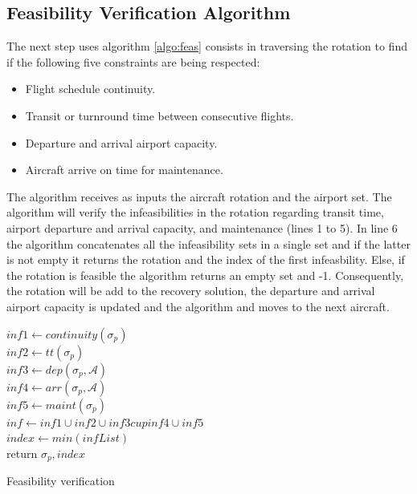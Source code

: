 \subsection{Feasibility Verification Algorithm} \label{sec:feasVer}
The next step uses algorithm \ref{algo:feas} consists in traversing the rotation to find  if the following five constraints are being respected:\\

\begin{itemize}
	\item Flight schedule continuity.\\
	\item Transit or turnround time between consecutive flights.\\
	\item Departure and arrival airport capacity.\\
	\item Aircraft arrive on time for maintenance.\\
\end{itemize}

The algorithm receives as inputs the aircraft rotation and the airport set.   The algorithm will  verify the infeasibilities in the rotation regarding transit time, airport departure and arrival capacity, and maintenance (lines 1 to 5). In line 6 the algorithm concatenates all the infeasibility sets in a single set and if the latter is not empty it returns the rotation and the index of the first infeasbility. Else, if the rotation is feasible the algorithm returns an empty set and -1. Consequently, the rotation will be add to the recovery solution, the departure and arrival airport capacity is updated and the algorithm and moves to the next aircraft.



	\begin{algorithm}[H]
		\DontPrintSemicolon
		$inf1 \gets continuity(\sigma_p)$\\		%
		$inf2 \gets tt(\sigma_p)$\\ 		%
		$inf3 \gets dep(\sigma_p, \mathcal{A})$\\%
		$inf4 \gets arr(\sigma_p, \mathcal{A})$\\%
		$inf5 \gets maint(\sigma_p)$\\ %
		$inf \gets inf1 \cup inf2 \cup inf3 cup inf4 \cup inf5$\\
		{
			$index \gets min(infList)$\\
			return $\sigma_p, index$\\
		}
		\caption{Feasibility verification}
		\label{algo:feas}
	\end{algorithm}

